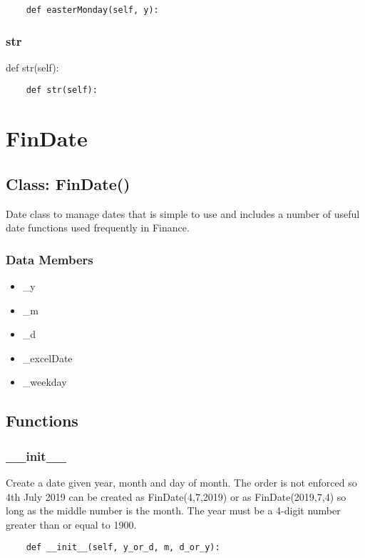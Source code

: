 \documentclass[twoside,11pt]{book}
\begin{document}
\begin{lstlisting}
    def easterMonday(self, y):
\end{lstlisting}

\subsubsection*{{\bf str}}
def str(self): 

\begin{lstlisting}
    def str(self):
\end{lstlisting}

\newpage
\section{FinDate}

\subsection*{Class: FinDate()}
Date class to manage dates that is simple to use and includes a number of useful date functions used frequently in Finance.  

\subsubsection*{Data Members}
\begin{itemize}
\item{\_y}
\item{\_m}
\item{\_d}
\item{\_excelDate}
\item{\_weekday}
\end{itemize}

\subsection*{Functions}

\subsubsection*{{\bf \_\_init\_\_}}
Create a date given year, month and day of month. The order is not enforced so 4th July 2019 can be created as FinDate(4,7,2019) or as FinDate(2019,7,4) so long as the middle number is the month. The year must be a 4-digit number greater than or equal to 1900.  

\begin{lstlisting}
    def __init__(self, y_or_d, m, d_or_y):
\end{lstlisting}
\end{document}
